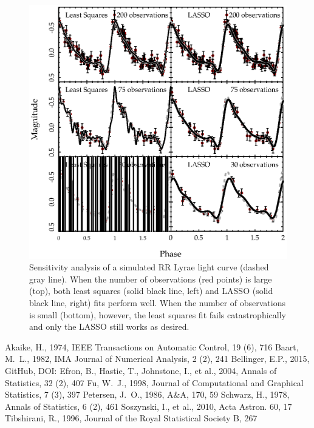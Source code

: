 \documentclass[11pt,twoside]{book}
\begin{document}
\begin{figure}[!ht]
    \centering
    \includegraphics[width=\textwidth,keepaspectratio]{bellinger-fig3.eps}
    \caption{Sensitivity analysis of a simulated RR Lyrae light curve (dashed gray line). When the number of observations (red points) is large (top), both least squares (solid black line, left) and LASSO (solid black line, right) fits perform well. When the number of observations is small (bottom), however, the least squares fit fails catastrophically and only the LASSO still works as desired.} 
    \label{fig:sensitivity} 
\end{figure}
\begin{thebibliography}{}      
Akaike, H., 1974, IEEE Transactions on Automatic Control, 19 (6), 716
Baart, M.~L., 1982, IMA Journal of Numerical Analysis, 2 (2), 241
Bellinger, E.P., 2015, GitHub, DOI:
Efron, B., Hastie, T., Johnstone, I., et al., 2004, Annals of Statistics, 32 (2), 407
Fu, W.~J., 1998, Journal of Computational and Graphical Statistics, 7 (3), 397
Petersen, J.~O., 1986, A\&A, 170, 59
Schwarz, H., 1978, Annals of Statistics, 6 (2), 461
Soszynski, I., et al., 2010, Acta Astron. 60, 17
Tibshirani, R., 1996, Journal of the Royal Statistical Society B, 267
\end{thebibliography}
\end{document}
